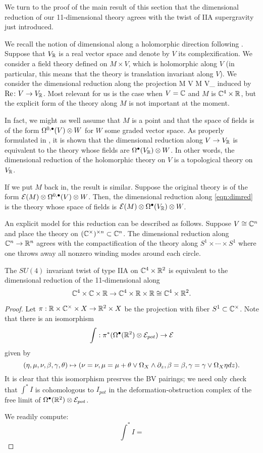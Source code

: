 
We turn to the proof of the main result of this section that the dimensional reduction of our 11-dimensional theory agrees with the twist of IIA supergravity just introduced. 

We recall the notion of dimensional along a holomorphic direction following \cite{ESW}. 
Suppose that $V_\mathbb R$ is a real vector space and denote by $V$ its complexification. 
We consider a field theory defined on $M \times V$, which is holomorphic along $V$ (in particular, this means that the theory is translation invariant along $V$).  
We consider the dimensional reduction along the projection 
\beqn\label{eqn:dimred}
M \times V \to M \times V_\RR
\eeqn
induced by ${\rm Re} \colon V \to V_\mathbb R$.
Most relevant for us is the case when $V = \mathbb C$ and $M$ is $\mathbb C^4 \times \mathbb R$, but the explicit form of the theory along $M$ is not important at the moment.

In fact, we might as well assume that $M$ is a point and that the space of fields is of the form $\Omega^{0,\bullet}(V) \otimes W$ for $W$ some graded vector space. 
As properly formulated in \cite{ESW}, it is shown that the dimensional reduction along $V \to V_\mathbb R$ is equivalent to the theory whose fields are $\Omega^\bullet(V_\mathbb R) \otimes W$. 
In other words, the dimensional reduction of the holomorphic theory on $V$ is a topological theory on $V_\mathbb R$. 

If we put $M$ back in, the result is similar. 
Suppose the original theory is of the form $\mathcal E(M) \otimes \Omega^{0,\bullet}(V) \otimes W$.
Then, the dimensional reduction along \eqref{eqn:dimred} is the theory whose space of fields is $\mathcal E(M) \otimes \Omega^\bullet(V_\mathbb R) \otimes W$.

An explicit model for this reduction can be described as follows. 
Suppose $V \cong \mathbb C^n$ and place the theory on $(\mathbb C^\times)^{\times n} \subset \mathbb C^n$. 
The dimensional reduction along $\mathbb C^n \to \mathbb R^n$ agrees with the compactification of the theory along $S^1 \times \cdots \times S^1$ where one throws away all nonzero winding modes around each circle.

\begin{prop}
The $SU(4)$ invariant twist of type IIA on $\mathbb C^4 \times \mathbb R^2$ is equivalent to the dimensional reduction of the 11-dimensional along  
\[
\mathbb C^4 \times \mathbb C \times \mathbb R \to \mathbb C^4 \times \mathbb R \times \mathbb R \cong \mathbb C^4 \times \mathbb R^2 .
\]
\end{prop}
\begin{proof}
Let $\pi : \mathbb{R}\times \mathbb{C}^{\times}\times X \to \mathbb{R}^{2}\times X$ be the projection with fiber $S^{1}\subset \mathbb{C}^{\times}$. Note that there is an isomorphism \[\int: \pi^{*}(\Omega^{\bullet}(\mathbb{R}^{2})\otimes \mathcal E_{pot})\to \mathcal E\] given by \[(\eta, \mu, \nu, \beta,\gamma,\theta)\mapsto (\nu = \nu, \mu = \mu + \theta \vee \Omega_{X} \wedge\partial_{z}, \beta = \beta, \gamma = \gamma\vee \Omega_{X} \eta dz ).\] It is clear that this isomorphism presrves the BV pairings; we need only check that $\int^{*} I$ is cohomologous to $I_{pot}$ in the deformation-obstruction complex of the free limit of $\Omega^{\bullet}(\mathbb{R}^{2})\otimes \mathcal E_{pot}$.

We readily compute:
\[\int^{*}I = \]
\end{proof}
